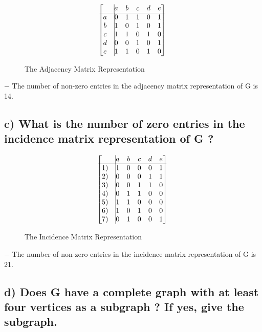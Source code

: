 \documentclass[12pt]{article}
\begin{document}
\begin{figure}[H]
            $$  
                \begin{bmatrix}{}
                     &\vline a & b & c & d & e \\ 
			\hline
		  a &\vline 0 & 1 & 1 & 0 & 1 \\
                  b &\vline 1 & 0 & 1 & 0 & 1 \\
                  c &\vline 1 & 1 & 0 & 1 & 0 \\
                  d &\vline 0 & 0 & 1 & 0 & 1 \\
		  e &\vline 1 & 1 & 0 & 1 & 0 \\
                \end{bmatrix}{} 
            $$
		\caption{The Adjacency Matrix Representation}
            \end{figure}{}
	$-$ The number of non-zero entries in the adjacency matrix representation of G is 14.\\

\subsection*{c) What is the number of zero entries in the incidence matrix representation of G ?} 

\begin{figure}[H]
            $$  
                \begin{bmatrix}{}
                      &\vline a & b & c & d & e \\ 
			\hline
		  1) &\vline 1 & 0 & 0 & 0 & 1 \\
                  2) &\vline 0 & 0 & 0 & 1 & 1 \\
                  3) &\vline 0 & 0 & 1 & 1 & 0 \\
                  4) &\vline 0 & 1 & 1 & 0 & 0 \\
		  5) &\vline 1 & 1 & 0 & 0 & 0 \\
 		  6) &\vline 1 & 0 & 1 & 0 & 0 \\
 		  7) &\vline 0 & 1 & 0 & 0 & 1 \\
                \end{bmatrix}{} 
            $$
		\caption{The Incidence Matrix Representation}
            \end{figure}{}

	$-$ The number of non-zero entries in the incidence matrix representation of G is 21.\\

\subsection*{d) Does G have a complete graph with at least four vertices as a subgraph ? If yes, give the subgraph.} 
\end{document}
